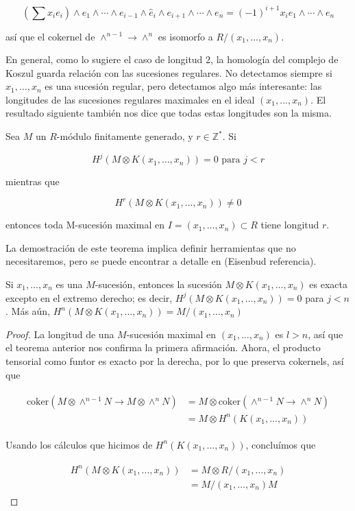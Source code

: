 $$ \left(\sum x_ie_i\right)\wedge e_1\wedge\cdots\wedge e_{i-1}\wedge \hat{e}_i\wedge e_{i+1}\wedge\cdots\wedge e_n = (-1)^{i+1}x_ie_1\wedge\cdots\wedge e_n$$

así que el cokernel de $\wedge^{n-1} \rightarrow \wedge^n$ es isomorfo a $R/(x_1,\dots,x_n)$.

En general, como lo sugiere el caso de longitud $2$, la homología del complejo de Koszul guarda relación con las sucesiones regulares. No detectamos siempre si $x_1, \dots, x_n$ es una sucesión regular, pero detectamos algo más interesante: las longitudes de las sucesiones regulares maximales en el ideal $(x_1, \dots, x_n)$. El resultado siguiente también nos dice que todas estas longitudes son la misma.

\begin{theorem}\label{sequence-length-r-theorem}
Sea $M$ un $R$-módulo finitamente generado, y $r \in \mathbb{Z}^*$. Si

$$ H^j(M\otimes K(x_1,\dots,x_n)) = 0 \textrm{ para } j < r $$

mientras que

$$ H^r(M\otimes K(x_1,\dots,x_n)) \neq 0 $$

entonces toda M-sucesión maximal en $I = (x_1,\dots, x_n) \subset R$ tiene longitud $r$.
\end{theorem}

La demostración de este teorema implica definir herramientas que no necesitaremos, pero se puede encontrar a detalle en (Eisenbud referencia).

\begin{corollary}
Si $x_1,\dots,x_n$ es una $M$-sucesión, entonces la sucesión $M\otimes K(x_1,\dots, x_n)$ es exacta excepto en el extremo derecho; es decir, $H^j(M\otimes K(x_1, \dots, x_n)) = 0$ para $j < n$. Más aún, $H^n(M\otimes K(x_1, \dots, x_n)) = M/(x_1, \dots, x_n)$
\end{corollary}
\begin{proof}
La longitud de una $M$-sucesión maximal en $(x_1, \dots, x_n)$  es $l>n$, así que el teorema anterior nos confirma la primera afirmación. Ahora, el producto tensorial como funtor es exacto por la derecha, por lo que preserva cokernels, así que

\begin{align*}
\begin{split}
\textrm{coker}(M\otimes\wedge^{n-1}N\rightarrow M\otimes\wedge^nN) & = M\otimes \textrm{coker}(\wedge^{n-1}N\rightarrow \wedge^nN)\\
& = M \otimes H^n(K(x_1,\dots,x_n))
\end{split}
\end{align*}

Usando los cálculos que hicimos de $H^n(K(x_1,\dots,x_n))$, concluímos que

\begin{align*}
\begin{split}
H^n(M\otimes K(x_1,\dots,x_n)) & = M\otimes R/(x_1,\dots,x_n)\\
& = M/(x_1,\dots,x_n)M
\end{split}
\end{align*}

\end{proof}

